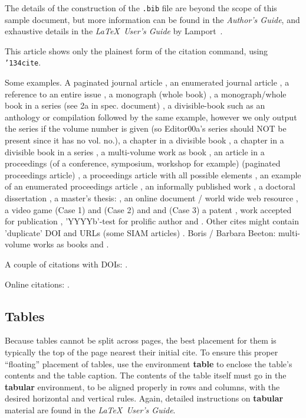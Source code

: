 The details of the construction of the \texttt{.bib} file
are beyond the scope of this sample document, but more
information can be found in the \textit{Author's Guide},
and exhaustive details in the \textit{\LaTeX\ User's
Guide} by Lamport~.

This article shows only the plainest form
of the citation command, using \texttt{{\char'134}cite}.

Some examples.  A paginated journal article \cite{Abril07}, an enumerated
journal article \cite{Cohen07}, a reference to an entire issue \cite{JCohen96},
a monograph (whole book) \cite{Kosiur01}, a monograph/whole book in a series (see 2a in spec. document)
\cite{Harel79}, a divisible-book such as an anthology or compilation \cite{Editor00}
followed by the same example, however we only output the series if the volume number is given
\cite{Editor00a} (so Editor00a's series should NOT be present since it has no vol. no.),
a chapter in a divisible book \cite{Spector90}, a chapter in a divisible book
in a series \cite{Douglass98}, a multi-volume work as book \cite{Knuth97},
an article in a proceedings (of a conference, symposium, workshop for example)
(paginated proceedings article) \cite{Andler79}, a proceedings article
with all possible elements \cite{Smith10}, an example of an enumerated
proceedings article \cite{VanGundy07},
an informally published work \cite{Harel78}, a doctoral dissertation \cite{Clarkson85},
a master's thesis: \cite{anisi03}, an online document / world wide web
resource \cite{Thornburg01, Ablamowicz07, Poker06}, a video game (Case 1) \cite{Obama08} and (Case 2) \cite{Novak03}
and \cite{Lee05} and (Case 3) a patent \cite{JoeScientist001},
work accepted for publication \cite{rous08}, 'YYYYb'-test for prolific author
\cite{SaeediMEJ10} and \cite{SaeediJETC10}. Other cites might contain
'duplicate' DOI and URLs (some SIAM articles) \cite{Kirschmer:2010:AEI:1958016.1958018}.
Boris / Barbara Beeton: multi-volume works as books
\cite{MR781536} and \cite{MR781537}.

A couple of citations with DOIs: \cite{2004:ITE:1009386.1010128,
  Kirschmer:2010:AEI:1958016.1958018}. 

Online citations: \cite{TUGInstmem, Thornburg01, CTANacmart}.  


\subsection{Tables}
Because tables cannot be split across pages, the best
placement for them is typically the top of the page
nearest their initial cite.  To
ensure this proper ``floating'' placement of tables, use the
environment \textbf{table} to enclose the table's contents and
the table caption.  The contents of the table itself must go
in the \textbf{tabular} environment, to
be aligned properly in rows and columns, with the desired
horizontal and vertical rules.  Again, detailed instructions
on \textbf{tabular} material
are found in the \textit{\LaTeX\ User's Guide}.

